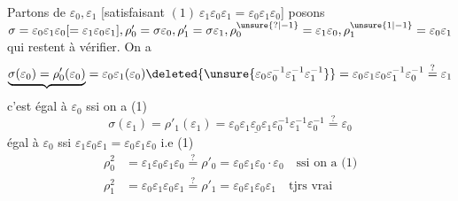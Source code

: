 {Partons de $\varepsilon_0,\varepsilon_1$ [satisfaisant $(1)\ \boxed{\varepsilon_1\varepsilon_0\varepsilon_1=\varepsilon_0\varepsilon_1\varepsilon_0}$]
posons $\sigma=\varepsilon_0\varepsilon_1\varepsilon_0[=\varepsilon_1\varepsilon_0\varepsilon_1],\rho'_0=\sigma \varepsilon_0,\rho'_1=\sigma \varepsilon_1,\rho_0^{\unsure{?|-1}}=\varepsilon_1\varepsilon_0,\rho_1^{\unsure{1|-1}}=\varepsilon_0\varepsilon_1$
   qui restent à vérifier. On a
\[\underbrace{\sigma(\varepsilon_0)=\rho'_0(\varepsilon_0)}=\varepsilon_0\varepsilon_1(\varepsilon_0)\deleted{\unsure{\varepsilon_0\varepsilon_0^{-1}\varepsilon_1^{-1}\varepsilon_1^{-1}}}=\varepsilon_0\varepsilon_1\varepsilon_0\varepsilon_1^{-1}\varepsilon_0^{-1}\stackrel{?}{=}\varepsilon_1\]
c'est égal à $\varepsilon_0$ ssi  on a (1)
\[\sigma(\varepsilon_1)=\rho'_1(\varepsilon_1)=\varepsilon_0\underline{\varepsilon_1\varepsilon_0\varepsilon_1}\varepsilon_0^{-1}\varepsilon_1^{-1}\varepsilon_0^{-1}\stackrel{?}{=}\varepsilon_0\]
égal à $\varepsilon_0$ ssi $\varepsilon_1\varepsilon_0\varepsilon_1=\varepsilon_0\varepsilon_1\varepsilon_0$ i.e (1)}
\[\begin{aligned}
\rho_0^2&=\varepsilon_1\varepsilon_0\varepsilon_1\varepsilon_0\stackrel{?}{=}\rho'_0=\varepsilon_0\varepsilon_1\varepsilon_0\mathbin{\cdot}\varepsilon_0\quad\text{ssi on a (1)}\\
\rho_1^2&=\varepsilon_0\varepsilon_1\varepsilon_0\varepsilon_1\stackrel{?}{=}\rho'_1=\varepsilon_0\varepsilon_1\varepsilon_0\varepsilon_1\quad\text{tjrs vrai}
\end{aligned}\]
